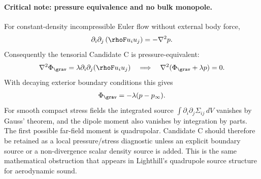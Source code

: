 
\paragraph{Critical note: pressure equivalence and no bulk monopole.}
For constant-density incompressible Euler flow without external body force,
\begin{align}
    \partial_i\partial_j\left(\rhoF u_i u_j\right)
    =
    -\nabla^2p .
\end{align}
Consequently the tensorial Candidate C is pressure-equivalent:
\begin{align}
    \nabla^2\Phi_{\grav}
    =
    \lambda\partial_i\partial_j(\rhoF u_i u_j)
    \quad\Longrightarrow\quad
    \nabla^2(\Phi_{\grav}+\lambda p)=0 .
\end{align}
With decaying exterior boundary conditions this gives
\begin{align}
    \Phi_{\grav}=-\lambda(p-p_\infty) .
\end{align}
For smooth compact stress fields the integrated source
\(\int\partial_i\partial_j\Sigma_{ij}\,dV\) vanishes by Gauss' theorem, and the
dipole moment also vanishes by integration by parts.  The first possible
far-field moment is quadrupolar.  Candidate C should therefore be retained as a
local pressure/stress diagnostic unless an explicit boundary source or a
non-divergence scalar density source is added.  This is the same mathematical
obstruction that appears in Lighthill's quadrupole source structure for
aerodynamic sound.


